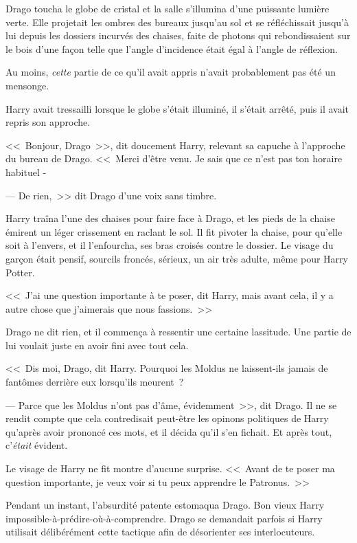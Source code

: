 Drago toucha le globe de cristal et la salle s'illumina d'une puissante lumière verte. Elle projetait les ombres des bureaux jusqu'au sol et se réfléchissait jusqu'à lui depuis les dossiers incurvés des chaises, faite de photons qui rebondissaient sur le bois d'une façon telle que l'angle d'incidence était égal à l'angle de réflexion.

Au moins, \emph{cette} partie de ce qu'il avait appris n'avait probablement pas été un mensonge.

Harry avait tressailli lorsque le globe s'était illuminé, il s'était arrêté, puis il avait repris son approche.

<<~Bonjour, Drago~>>, dit doucement Harry, relevant sa capuche à l'approche du bureau de Drago. <<~Merci d'être venu. Je sais que ce n'est pas ton horaire habituel -

--- De rien,~>> dit Drago d'une voix sans timbre.

Harry traîna l'une des chaises pour faire face à Drago, et les pieds de la chaise émirent un léger crissement en raclant le sol. Il fit pivoter la chaise, pour qu'elle soit à l'envers, et il l'enfourcha, ses bras croisés contre le dossier. Le visage du garçon était pensif, sourcils froncés, sérieux, un air très adulte, même pour Harry Potter.

<<~J'ai une question importante à te poser, dit Harry, mais avant cela, il y a autre chose que j'aimerais que nous fassions.~>>

Drago ne dit rien, et il commença à ressentir une certaine lassitude. Une partie de lui voulait juste en avoir fini avec tout cela.

<<~Dis moi, Drago, dit Harry. Pourquoi les Moldus ne laissent-ils jamais de fantômes derrière eux lorsqu'ils meurent~?

--- Parce que les Moldus n'ont pas d'âme, évidemment~>>, dit Drago. Il ne se rendit compte que cela contredisait peut-être les opinons politiques de Harry qu'après avoir prononcé ces mots, et il décida qu'il s'en fichait. Et après tout, c'\emph{était} évident.

Le visage de Harry ne fit montre d'aucune surprise. <<~Avant de te poser ma question importante, je veux voir si tu peux apprendre le Patronus.~>>

Pendant un instant, l'absurdité patente estomaqua Drago. Bon vieux Harry impossible-à-prédire-où-à-comprendre. Drago se demandait parfois si Harry utilisait délibérément cette tactique afin de désorienter ses interlocuteurs.

